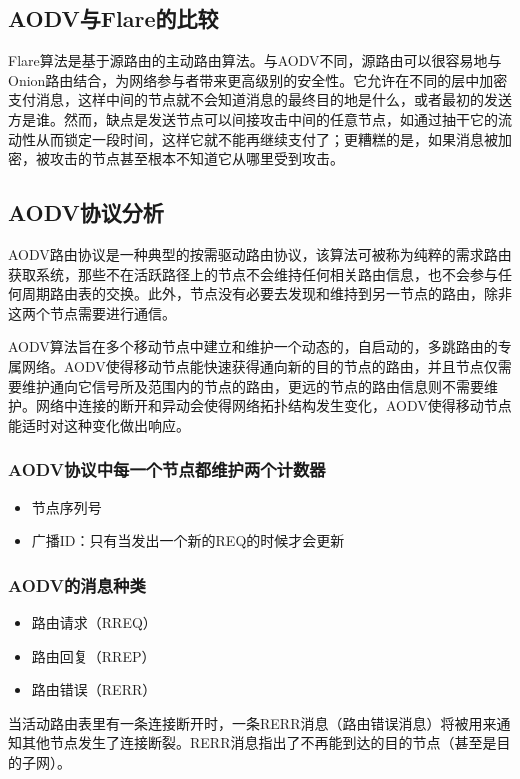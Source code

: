\documentclass[12pt,a4paper]{article}
\begin{document}
\subsection{AODV与Flare的比较}
Flare算法是基于源路由的主动路由算法。与AODV不同，源路由可以很容易地与Onion路由结合，为网络参与者带来更高级别的安全性。它允许在不同的层中加密支付消息，这样中间的节点就不会知道消息的最终目的地是什么，或者最初的发送方是谁。然而，缺点是发送节点可以间接攻击中间的任意节点，如通过抽干它的流动性从而锁定一段时间，这样它就不能再继续支付了；更糟糕的是，如果消息被加密，被攻击的节点甚至根本不知道它从哪里受到攻击。

\subsection{AODV协议分析}
AODV路由协议是一种典型的按需驱动路由协议，该算法可被称为纯粹的需求路由获取系统，那些不在活跃路径上的节点不会维持任何相关路由信息，也不会参与任何周期路由表的交换。此外，节点没有必要去发现和维持到另一节点的路由，除非这两个节点需要进行通信。

AODV算法旨在多个移动节点中建立和维护一个动态的，自启动的，多跳路由的专属网络。AODV使得移动节点能快速获得通向新的目的节点的路由，并且节点仅需要维护通向它信号所及范围内的节点的路由，更远的节点的路由信息则不需要维护。网络中连接的断开和异动会使得网络拓扑结构发生变化，AODV使得移动节点能适时对这种变化做出响应。

\subsubsection{AODV协议中每一个节点都维护两个计数器}
\begin{itemize}
\item 节点序列号
\item 广播ID：只有当发出一个新的REQ的时候才会更新
\end{itemize}

\subsubsection{AODV的消息种类}
\begin{itemize}
\item 路由请求（RREQ）
\item 路由回复（RREP）
\item 路由错误（RERR）
\end{itemize}
当活动路由表里有一条连接断开时，一条RERR消息（路由错误消息）将被用来通知其他节点发生了连接断裂。RERR消息指出了不再能到达的目的节点（甚至是目的子网）。
\end{document}
